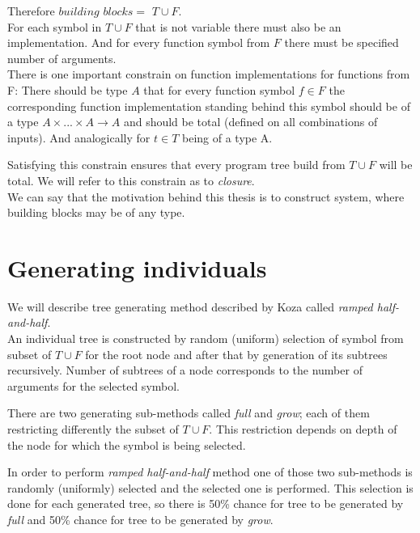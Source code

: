 \documentclass[12pt,a4paper]{report}
\begin{document}
\newcommand{\TuF}{$T \cup F$\xspace}

Therefore $building$ $blocks = $ \TuF.\\

For each symbol in \TuF that is not variable 
there must also be an implementation.
And for every function symbol from $F$ there must be specified 
number of arguments.\\

There is one important constrain on function implementations for functions from F:
There should be type $A$ that for every function symbol $f \in F$ the corresponding function implementation standing behind this symbol should be of a type 
$A \times ... \times A \rightarrow A$ and should be total (defined on all
combinations of inputs). And analogically for $t \in T$ being of a type A.  

Satisfying this constrain ensures that every program tree build 
from \TuF will be total. We will refer to this constrain as to \textit{closure}.\\

We can say that the motivation behind this thesis is to construct system,
where building blocks may be of any type. 

\section{Generating individuals}
\label{GPgene}

We will describe tree generating method described by Koza \cite{koza92}
called \textit{ramped half-and-half}. \\

An individual tree is constructed by random (uniform) selection of symbol from 
subset of \TuF for the root node and after that by generation of its 
subtrees recursively. 
Number of subtrees of a node corresponds 
to the number of arguments for the selected symbol. 

There are two generating sub-methods called \textit{full} and 
\textit{grow}; each of them restricting differently the subset of \TuF. 
This restriction depends on depth of the
node for which the symbol is being selected. 

In order to perform \textit{ramped half-and-half} method
one of those two sub-methods is randomly (uniformly) 
selected and the selected one is performed.
This selection is done for each generated tree, so there
is 50\% chance for tree to be generated by \textit{full} 
and 50\% chance for tree to be generated by \textit{grow}.\\
\end{document}
